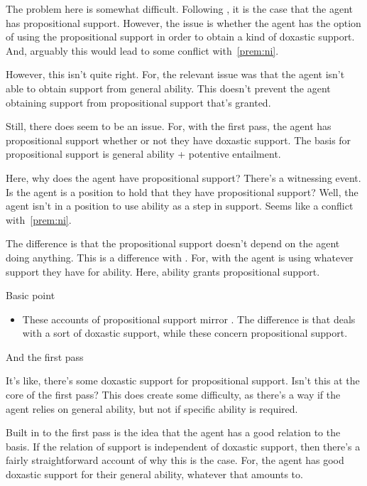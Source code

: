 {
  \begin{note}
    The problem here is somewhat difficult.
    Following \citeauthor{Turri:2010aa}, it is the case that the agent has propositional support.
    However, the issue is whether the agent has the option of using the propositional support in order to obtain a kind of doxastic support.
    And, arguably this would lead to some conflict with~\ref{prem:ni}.

    However, this isn't quite right.
    For, the relevant issue was that the agent isn't able to obtain support from general ability.
    This doesn't prevent the agent obtaining support from propositional support that's granted.

    Still, there does seem to be an issue.
    For, with the first pass, the agent has propositional support whether or not they have doxastic support.
    The basis for propositional support is general ability + potentive entailment.

    Here, why does the agent have propositional support?
    There's a witnessing event.
    Is the agent is a position to hold that they have propositional support?
    Well, the agent isn't in a position to use ability as a step in support.
    Seems like a conflict with~\ref{prem:ni}.

    The difference is that the propositional support doesn't depend on the agent doing anything.
    This is a difference with \AR{}.
    For, with \AR{} the agent is using whatever support they have for ability.
    Here, ability grants propositional support.

    Basic point
    \begin{itemize}
    \item These accounts of propositional support mirror \AR{}.
      The difference is that \AR{} deals with a sort of doxastic support, while these concern propositional support.
    \end{itemize}
    And the first pass

    It's like, there's some doxastic support for propositional support.
    Isn't this at the core of the first pass?
    This does create some difficulty, as there's a way if the agent relies on general ability, but not if specific ability is required.

    Built in to the first pass is the idea that the agent has a good relation to the basis.
    If the relation of support is independent of doxastic support, then there's a fairly straightforward account of why this is the case.
    For, the agent has good doxastic support for their general ability, whatever that amounts to.
  \end{note}

}
